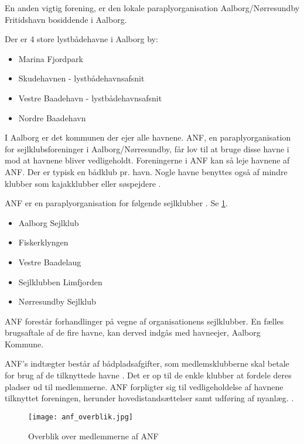 En anden vigtig forening, er den lokale paraplyorganisation Aalborg/Nørresundby Fritidshavn bosiddende i Aalborg.

Der er 4 store lystbådehavne i Aalborg by:
\begin{itemize}[noitemsep]
    \item Marina Fjordpark
    \item Skudehavnen - lystbådehavnsafsnit
    \item Vestre Baadehavn - lystbådehavnsafsnit
    \item Nordre Baadehavn
\end{itemize}

I Aalborg er det kommunen der ejer alle havnene. ANF, en paraplyorganisation for sejlklubsforeninger i Aalborg/Nørresundby, får lov til at bruge disse havne i mod at havnene bliver vedligeholdt. Foreningerne i ANF kan så leje havnene af ANF. Der er typisk en bådklub pr. havn. Nogle havne benyttes også af mindre klubber som kajakklubber eller søspejdere  \cite{int_vb_sl}.

ANF er en paraplyorganisation for følgende sejlklubber \cite{anf_havnereglement}. Se \cref{fig:anf_overblik}.
\begin{itemize}[noitemsep]
	\item Aalborg Sejlklub
	\item Fiskerklyngen
	\item Vestre Baadelaug
	\item Sejlklubben Limfjorden
	\item Nørresundby Sejlklub
\end{itemize}
 
ANF forestår forhandlinger på vegne af organisationens sejlklubber. En fælles brugsaftale af de fire havne, kan derved indgås med havneejer, Aalborg Kommune.

ANF's indtægter består af bådpladsafgifter, som medlemsklubberne skal betale for brug af de tilknyttede havne \cite{anf_budget_2013}. Det er op til de enkle klubber at fordele deres pladser ud til medlemmerne. ANF forpligter sig til vedligeholdelse af havnene tilknyttet foreningen, herunder hovedistandsættelser samt udføring af nyanlæg. \cite{anf_brugsaftale_2012}.

\begin{figure}
  \centering
  \texttt{[image: anf\_overblik.jpg]}
 	\caption{Overblik over medlemmerne af ANF} 	\label{fig:anf_overblik}
\end{figure}




